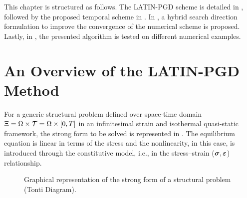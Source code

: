 This chapter is structured as follows. The LATIN-PGD scheme is detailed in , followed by the proposed temporal scheme in . In , a hybrid search direction formulation to improve the convergence of the numerical scheme is proposed. Lastly, in , the presented algorithm is tested on different numerical examples.

\section{An Overview of the LATIN-PGD Method}
\label{sec_latin}

For a generic structural problem defined over space-time domain $\Xi = \Omega \times {\cal T} = \Omega \times [0,T]$ in an infinitesimal strain and isothermal quasi-static framework, the strong form to be solved is represented in  \parencite{steinke2015finite,felippa1996recent}. The equilibrium equation is linear in terms of the stress and the nonlinearity, in this case, is introduced through the constitutive model, i.e., in the stress--strain ($\mbox{$\bm \sigma$},\mbox{$\bm \varepsilon $}$) relationship.
\begin{figure}[hbt!]
	\centering
	\caption{Graphical representation of the strong form of a structural problem (Tonti Diagram).}
	\label{fig_tonti}
\end{figure}
